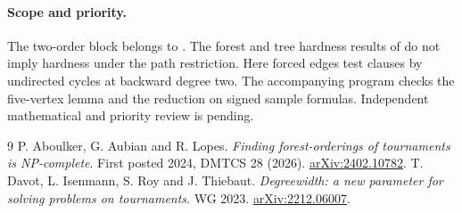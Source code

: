 \documentclass[10pt]{article}
\begin{document}
\paragraph{Scope and priority.} The two-order block belongs to \cite{dir}. The forest and tree hardness results of \cite{aal} do not imply hardness under the path restriction. Here forced edges test clauses by undirected cycles at backward degree two. The accompanying program checks the five-vertex lemma and the reduction on signed sample formulas. Independent mathematical and priority review is pending.
\begin{thebibliography}{9}
 P. Aboulker, G. Aubian and R. Lopes. \emph{Finding forest-orderings of tournaments is NP-complete}. First posted 2024, DMTCS 28 (2026). \href{https://arxiv.org/abs/2402.10782}{arXiv:2402.10782}.
 T. Davot, L. Isenmann, S. Roy and J. Thiebaut. \emph{Degreewidth: a new parameter for solving problems on tournaments}. WG 2023. \href{https://arxiv.org/abs/2212.06007}{arXiv:2212.06007}.
\end{thebibliography}
\end{document}
